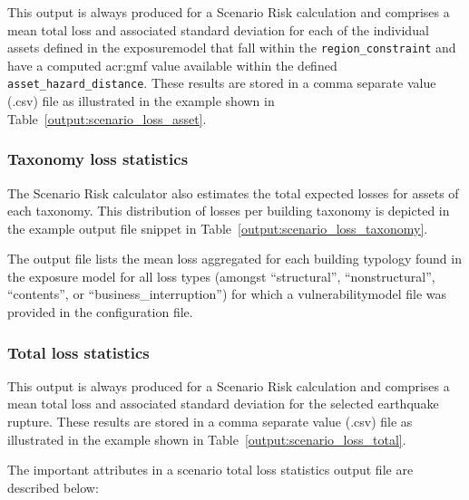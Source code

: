 This output is always produced for a Scenario Risk calculation and comprises a
mean total loss and associated standard deviation for each of the individual
\glspl{asset} defined in the \gls{exposuremodel} that fall within the
\Verb+region_constraint+ and have a computed \gls{acr:gmf} value available
within the defined \Verb+asset_hazard_distance+. These results are stored in a
comma separate value (.csv) file as illustrated in the example shown in
Table~\ref{output:scenario_loss_asset}.




\subsubsection{Taxonomy loss statistics}
\label{subsubsec:scenario_taxonomy_loss_statistics}

The Scenario Risk calculator also estimates the total expected losses for
assets of each \gls{taxonomy}. This distribution of losses per building
\gls{taxonomy} is depicted in the example output file snippet in
Table~\ref{output:scenario_loss_taxonomy}.



The output file lists the mean loss aggregated for each building typology
found in the exposure model for all loss types (amongst ``structural'',
``nonstructural'', ``contents'', or ``business\_interruption'') for which a
\gls{vulnerabilitymodel} file was provided in the configuration file.


\subsubsection{Total loss statistics}
\label{subsubsec:scenario_total_loss_statistics}

This output is always produced for a Scenario Risk calculation and comprises a
mean total loss and associated standard deviation for the selected earthquake
rupture. These results are stored in a comma separate value (.csv) file as
illustrated in the example shown in Table~\ref{output:scenario_loss_total}.



The important attributes in a scenario total loss statistics output file are
described below:


